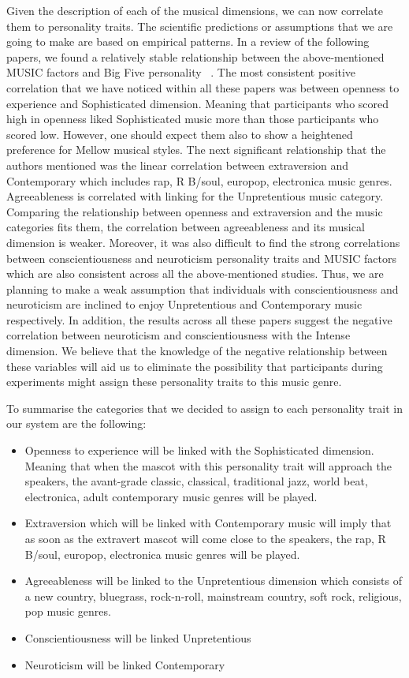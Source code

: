 Given the description of each of the musical dimensions, we can now correlate them to personality traits.
The scientific predictions or assumptions that we are going to make are based on empirical patterns.
In a review of the following papers, we found a relatively stable relationship between the
above-mentioned MUSIC factors and Big Five
personality ~\cite{schafer2017can,bonneville2013music,fricke2017personality,greenberg2016song,langmeyer2012music}.
The most consistent positive correlation that we have noticed within all these papers was
between openness to experience and Sophisticated dimension.
Meaning that participants who scored high in openness liked
Sophisticated music more than those participants who scored low.
However, one should expect them also to show a heightened preference for Mellow musical styles.
The next significant relationship that the authors mentioned was the linear correlation between
extraversion and Contemporary which includes rap, R B/soul, europop, electronica music genres.
Agreeableness is correlated with linking for the Unpretentious music category.
Comparing the relationship between openness and extraversion and the music categories fits them,
the correlation between agreeableness and its musical dimension is weaker.
Moreover, it was also difficult to find the strong correlations between
conscientiousness and neuroticism personality traits and MUSIC factors which are
also consistent across all the above-mentioned studies.
Thus, we are planning to make a weak assumption that individuals with
conscientiousness and neuroticism are inclined to enjoy Unpretentious and Contemporary music respectively.
In addition, the results across all these papers suggest the negative correlation between
neuroticism and conscientiousness with the Intense dimension.
We believe that the knowledge of the negative relationship between these variables will aid us to eliminate
the possibility that participants during experiments might assign these personality traits to this music genre.

To summarise the categories that we decided to assign to each personality trait in our system are the following:
\begin{itemize}
\item Openness to experience will be linked with the Sophisticated dimension.
      Meaning that when the mascot with this personality trait will approach the speakers,
      the avant-grade classic, classical, traditional jazz, world beat, electronica, adult
      contemporary music genres will be played.
\item Extraversion which will be linked with Contemporary music will imply that as soon as the extravert
      mascot will come close to the speakers, the rap, R B/soul, europop, electronica music genres will be played.
\item Agreeableness will be linked to the Unpretentious dimension which consists of a new country,
      bluegrass, rock-n-roll, mainstream country, soft rock, religious, pop music genres.
\item Conscientiousness will be linked Unpretentious
\item Neuroticism will be linked Contemporary
\end{itemize}

